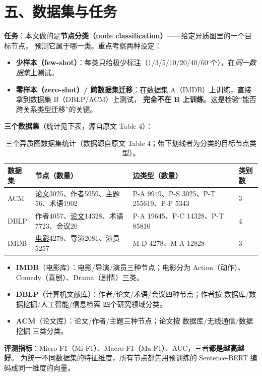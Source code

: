 \documentclass[11pt,UTF8,fontset=fandol]{ctexart}
\begin{document}
\section{五、数据集与任务}

\textbf{任务}：本文做的是\textbf{节点分类（node classification）}——给定异质图里的一个目标节点，
预测它属于哪一类。重点考察两种设定：
\begin{itemize}[leftmargin=2em]
  \item \textbf{少样本（few-shot）}：每类只给极少标注（1/3/5/10/20/40/60 个），在\emph{同一数据集}上测试。
  \item \textbf{零样本（zero-shot）/ 跨数据集迁移}：在数据集 A（IMDB）上训练，直接拿到数据集 B（DBLP/ACM）上测试，
        \textbf{完全不在 B 上训练}。这是检验“能否跨关系类型迁移”的关键。
\end{itemize}

\textbf{三个数据集}（统计见下表，源自原文 Table 4）：

\begin{table}[H]\centering
\caption{三个异质图数据集统计（数据源自原文 Table 4；带下划线者为分类的目标节点类型）。}
\begin{tabular}{llll}
\toprule
\textbf{数据集} & \textbf{节点（数量）} & \textbf{边类型（数量）} & \textbf{类别数} \\
\midrule
ACM  & \underline{论文}3025、作者5959、主题56、术语1902 & P-A 9949、P-S 3025、P-T 255619、P-P 5343 & 3 \\
DBLP & 作者4057、\underline{论文}14328、术语7723、会议20 & P-A 19645、P-C 14328、P-T 85810 & 4 \\
IMDB & \underline{电影}4278、导演2081、演员5257 & M-D 4278、M-A 12828 & 3 \\
\bottomrule
\end{tabular}
\end{table}

\begin{itemize}[leftmargin=2em]
  \item \textbf{IMDB}（电影库）：电影/导演/演员三种节点；电影分为 Action（动作）、Comedy（喜剧）、Drama（剧情）三类。
  \item \textbf{DBLP}（计算机文献库）：作者/论文/术语/会议四种节点；作者按 数据库/数据挖掘/人工智能/信息检索 四个研究领域分类。
  \item \textbf{ACM}（论文库）：论文/作者/主题三种节点；论文按 数据库/无线通信/数据挖掘 三类分类。
\end{itemize}

\textbf{评测指标}：Micro-F1（Mi-F1）、Macro-F1（Ma-F1）、AUC，三者\textbf{都是越高越好}。
为统一不同数据集的特征维度，所有节点都先用预训练的 Sentence-BERT 编码成同一维度的向量。
\end{document}
